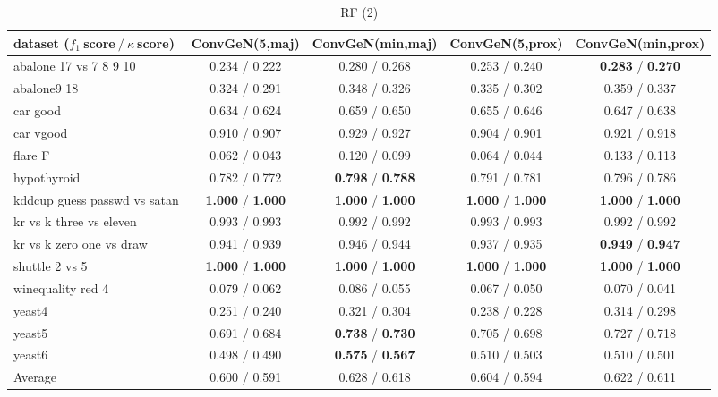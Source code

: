 \begin{table*}[ht]\scriptsize\caption{RF (2)}\label{tab:results:RF:B}\centering\tabularnewline
\begin{tabular}{l|@{\hskip3pt}c@{\hskip3pt}|@{\hskip3pt}c@{\hskip3pt}|@{\hskip3pt}c@{\hskip3pt}|@{\hskip3pt}c@{\hskip3pt}}\hline
\textbf{dataset ($f_1~$score$~/~\kappa~$score)} & \textbf{ConvGeN(5,maj)} & \textbf{ConvGeN(min,maj)} & \textbf{ConvGeN(5,prox)} & \textbf{ConvGeN(min,prox)}
\tabularnewline
\hline
abalone 17 vs 7 8 9 10 &  0.234  /  0.222  &  0.280  /  0.268  &  0.253  /  0.240  &  \textbf{0.283}  /  \textbf{0.270} 
\tabularnewline
abalone9 18 &  0.324  /  0.291  &  0.348  /  0.326  &  0.335  /  0.302  &  0.359  /  0.337 
\tabularnewline
car good &  0.634  /  0.624  &  0.659  /  0.650  &  0.655  /  0.646  &  0.647  /  0.638 
\tabularnewline
car vgood &  0.910  /  0.907  &  0.929  /  0.927  &  0.904  /  0.901  &  0.921  /  0.918 
\tabularnewline
flare F &  0.062  /  0.043  &  0.120  /  0.099  &  0.064  /  0.044  &  0.133  /  0.113 
\tabularnewline
hypothyroid &  0.782  /  0.772  &  \textbf{0.798}  /  \textbf{0.788}  &  0.791  /  0.781  &  0.796  /  0.786 
\tabularnewline
kddcup guess passwd vs satan &  \textbf{1.000}  /  \textbf{1.000}  &  \textbf{1.000}  /  \textbf{1.000}  &  \textbf{1.000}  /  \textbf{1.000}  &  \textbf{1.000}  /  \textbf{1.000} 
\tabularnewline
kr vs k three vs eleven &  0.993  /  0.993  &  0.992  /  0.992  &  0.993  /  0.993  &  0.992  /  0.992 
\tabularnewline
kr vs k zero one vs draw &  0.941  /  0.939  &  0.946  /  0.944  &  0.937  /  0.935  &  \textbf{0.949}  /  \textbf{0.947} 
\tabularnewline
shuttle 2 vs 5 &  \textbf{1.000}  /  \textbf{1.000}  &  \textbf{1.000}  /  \textbf{1.000}  &  \textbf{1.000}  /  \textbf{1.000}  &  \textbf{1.000}  /  \textbf{1.000} 
\tabularnewline
winequality red 4 &  0.079  /  0.062  &  0.086  /  0.055  &  0.067  /  0.050  &  0.070  /  0.041 
\tabularnewline
yeast4 &  0.251  /  0.240  &  0.321  /  0.304  &  0.238  /  0.228  &  0.314  /  0.298 
\tabularnewline
yeast5 &  0.691  /  0.684  &  \textbf{0.738}  /  \textbf{0.730}  &  0.705  /  0.698  &  0.727  /  0.718 
\tabularnewline
yeast6 &  0.498  /  0.490  &  \textbf{0.575}  /  \textbf{0.567}  &  0.510  /  0.503  &  0.510  /  0.501 
\tabularnewline
\hline Average &  0.600  /  0.591  &  0.628  /  0.618  &  0.604  /  0.594  &  0.622  /  0.611 
\tabularnewline
\hline\end{tabular}\end{table*}



